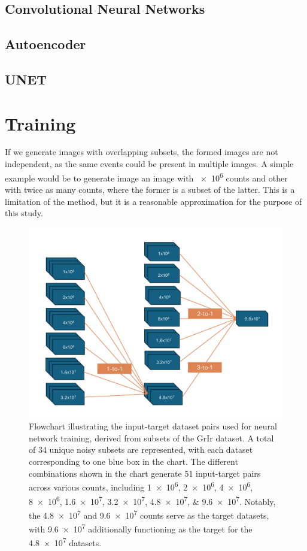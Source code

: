 \subsection{Convolutional Neural Networks}
\subsection{Autoencoder}
\cite{goodfellowDeepLearning2016}
\subsection{UNET}



\section{Training}

If we generate images with overlapping subsets, the formed images are not independent, as the same events could be present in multiple images. A simple example would be to generate image an image with \num{e6} counts and other with twice as many counts, where the former is a subset of the latter. This is a limitation of the method, but it is a reasonable approximation for the purpose of this study.

\begin{figure}[h]
    \centering
    \includegraphics[width=1\linewidth]{images/training_flowchart.pdf}
    \caption{Flowchart illustrating the input-target dataset pairs used for neural network training, derived from subsets of the \gls{GrIr} dataset. A total of \num{34} unique noisy subsets are represented, with each dataset corresponding to one blue box in the chart. The different combinations shown in the chart generate \num{51} input-target pairs across various counts, including \numlist{1e6;2e6;4e6;8e6;1.6e7;3.2e7;4.8e7;9.6e7}. Notably, the \num{4.8e7} and \num{9.6e7} counts serve as the target datasets, with \num{9.6e7} additionally functioning as the target for the \num{4.8e7} datasets.}
    \label{fig:training-data}
\end{figure}

